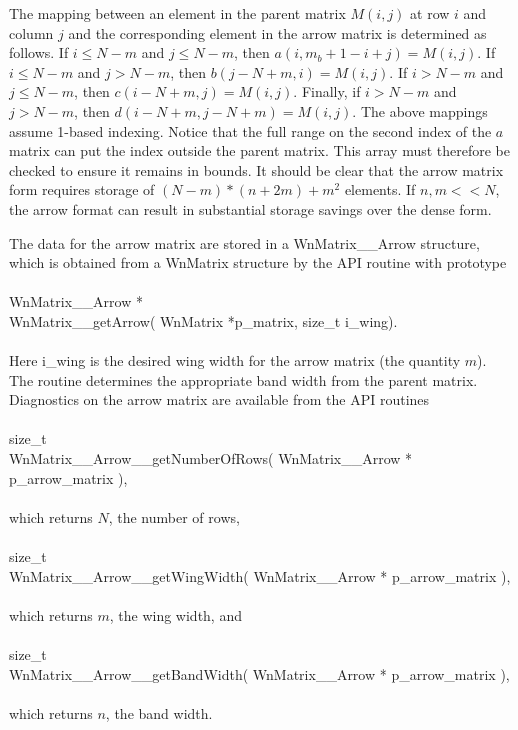 \documentclass{article}    %
\begin{document}
The mapping between an element in the parent matrix $M(i,j)$ at row $i$ and
column $j$ and the corresponding element in the arrow matrix is determined
as follows.  If $i \leq N - m$ and
$j \leq N - m$, then $a(i, m_b + 1 - i + j) = 
M(i,j)$.  If $i \leq N - m$ and $j > N - m$, then $b(j - N + m, i) = M(i,j)$.
If $i > N - m$ and $j \leq N - m$, then $c(i - N + m, j) = M(i,j)$.  Finally,
if $i > N - m$ and $j > N - m$, then $d(i - N + m, j - N + m) = M(i,j)$.
The above mappings assume 1-based indexing.  Notice that the full range
on the second index of the $a$ matrix can put the index outside the
parent matrix.  This array must therefore be checked to ensure it remains
in bounds.  It should be clear that the arrow matrix form requires storage
of $(N - m) * (n + 2 m) + m^2$ elements.  If $n,m << N$, the arrow format
can result in substantial storage savings over the dense form.

The data for the arrow matrix are stored in a WnMatrix\_\_Arrow structure,
which is obtained from a WnMatrix structure by the API routine with
prototype\\
\\
WnMatrix\_\_Arrow *\\
WnMatrix\_\_getArrow( WnMatrix *p\_matrix, size\_t i\_wing).\\
\\
Here i\_wing is the desired wing width for the arrow matrix (the quantity $m$).
The routine determines the appropriate band width from the parent matrix.
Diagnostics on the arrow matrix are available from the API routines\\
\\
size\_t\\
WnMatrix\_\_Arrow\_\_getNumberOfRows( WnMatrix\_\_Arrow * p\_arrow\_matrix ),\\
\\
which returns $N$, the number of rows,\\
\\
size\_t\\
WnMatrix\_\_Arrow\_\_getWingWidth( WnMatrix\_\_Arrow * p\_arrow\_matrix ),\\
\\
which returns $m$, the wing width, and\\
\\
size\_t\\
WnMatrix\_\_Arrow\_\_getBandWidth( WnMatrix\_\_Arrow * p\_arrow\_matrix ),\\
\\
which returns $n$, the band width.
\end{document}
